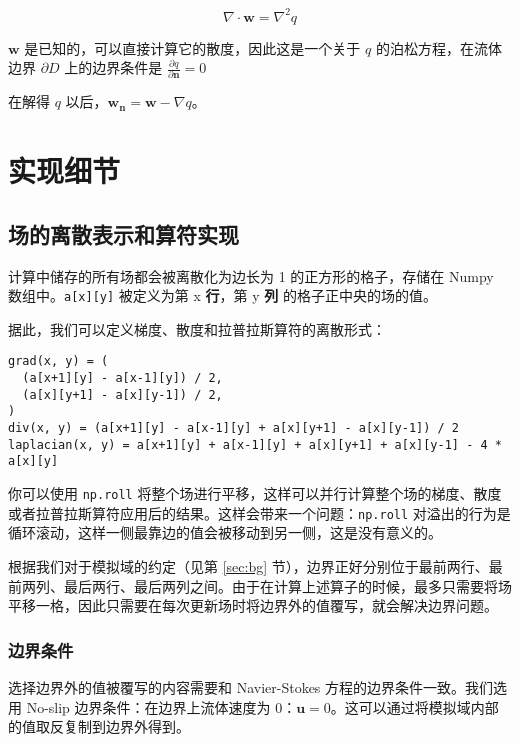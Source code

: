 \documentclass{ctexart}
\begin{document}
\begin{equation}
\nabla \cdot \mathbf{w} = \nabla^2 q
\end{equation}

$\mathbf{w}$ 是已知的，可以直接计算它的散度，因此这是一个关于 $q$ 的泊松方程，在流体边界 $\partial D$ 上的边界条件是 $\frac{\partial q}{\partial \mathbf{n}} = 0$

在解得 $q$ 以后，$\mathbf{w_n} = \mathbf{w} - \nabla q$。

\section{实现细节}

\subsection{场的离散表示和算符实现}

计算中储存的所有场都会被离散化为边长为 1 的正方形的格子，存储在 Numpy 数组中。\texttt{a[x][y]} 被定义为第 x \textbf{行}，第 y \textbf{列} 的格子正中央的场的值。

据此，我们可以定义梯度、散度和拉普拉斯算符的离散形式：

\begin{verbatim}
grad(x, y) = (
  (a[x+1][y] - a[x-1][y]) / 2,
  (a[x][y+1] - a[x][y-1]) / 2,
)
div(x, y) = (a[x+1][y] - a[x-1][y] + a[x][y+1] - a[x][y-1]) / 2
laplacian(x, y) = a[x+1][y] + a[x-1][y] + a[x][y+1] + a[x][y-1] - 4 * a[x][y]
\end{verbatim}

你可以使用 \texttt{np.roll} 将整个场进行平移，这样可以并行计算整个场的梯度、散度或者拉普拉斯算符应用后的结果。这样会带来一个问题：\texttt{np.roll} 对溢出的行为是循环滚动，这样一侧最靠边的值会被移动到另一侧，这是没有意义的。

根据我们对于模拟域的约定（见第 \ref{sec:bg} 节），边界正好分别位于最前两行、最前两列、最后两行、最后两列之间。由于在计算上述算子的时候，最多只需要将场平移一格，因此只需要在每次更新场时将边界外的值覆写，就会解决边界问题。

\subsubsection{边界条件}

选择边界外的值被覆写的内容需要和 Navier-Stokes 方程的边界条件一致。我们选用 No-slip 边界条件：在边界上流体速度为 0：$\mathbf{u} = 0$。这可以通过将模拟域内部的值取反复制到边界外得到。
\end{document}
